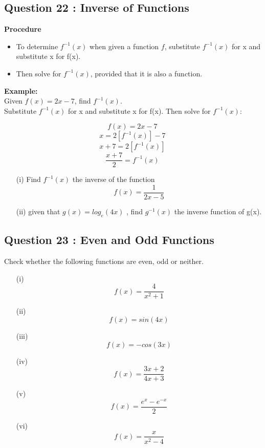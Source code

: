 \documentclass[]{article}
\begin{document}
\subsection*{Question 22 : Inverse of Functions}

\begin{framed}
	\textbf{Procedure}
	\begin{itemize}
		\item	To determine $f^{-1}(x)$ when given a function $f$, substitute $f^{-1}(x)$ for x and substitute x for f(x).
		\item Then solve for $f^{-1}(x)$, provided that it is also a function.
	\end{itemize}
\end{framed}

\begin{framed}
	
	\noindent	\textbf{Example:}\\ Given $f(x) = 2x - 7$, find $f^{-1}(x)$.
	\\
	\noindent Substitute $f^{-1}(x)$ for x and substitute x for f(x). Then solve for $f^{-1}(x)$:
	
	\[f(x) = 2x - 7\,\]
	\[x  = 2[f^{-1}(x)] - 7\,\]
	\[x + 7  = 2[f^{-1}(x)]\,\]
	\[\frac{x + 7}{2} = f^{-1}(x)\,\]
\end{framed}
\begin{itemize}
	\item[(i)] Find $f^{-1}(x)$ the inverse of the function 
	\[f(x) = \frac{1}{2x-5}\]
	\item[(ii)]  given that $g(x) = log_e (4x)$ , find $g^{-1} (x)$ the inverse function of g(x).
\end{itemize}




\subsection*{Question 23 : Even and Odd Functions}
Check whether the following functions are even, odd or neither.
\begin{multicols}{3}
	\begin{itemize}
		\item[(i)] \[f(x) = \frac{4}{x^2+1}\]
		\item[(ii)] \[f(x) = sin(4x) \]
		\item[(iii)] \[f(x) = -cos(3x) \]
		\item[(iv)] \[f(x) = \frac{3x+2}{4x+3} \]
		\item[(v)] \[f(x) =  \frac{e^{x} - e^{-x}}{2}\]
		\item[(vi)] \[f(x) = \frac{x}{x^2-4} \]
	\end{itemize}
\end{multicols}
\end{document}

